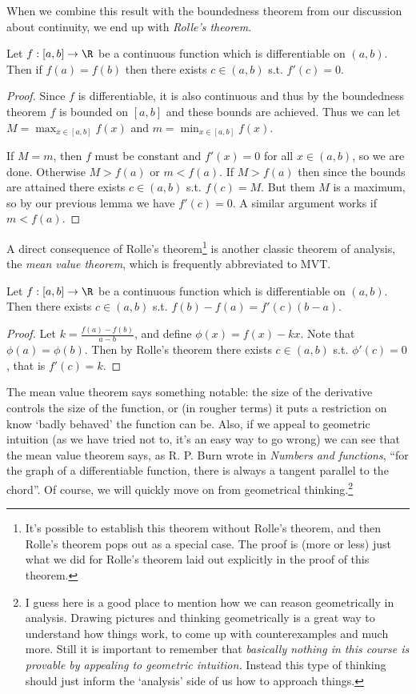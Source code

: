 When we combine this result with the boundedness theorem from our discussion about continuity, we end up with \emph{Rolle's theorem}.

\begin{theorem}
	Let $f: [a, b] \rightarrow \R$ be a continuous function which is differentiable on $(a, b)$. Then if $f(a) = f(b)$ then there exists $c \in (a, b)$ s.t. $f'(c) = 0$.
\end{theorem}
\begin{proof}
	Since $f$ is differentiable, it is also continuous and thus by the boundedness theorem $f$ is bounded on $[a, b]$ and these bounds are achieved.
	Thus we can let $M = \max_{x \in [a, b]} f(x)$ and $m = \min_{x \in [a, b]} f(x)$.

	If $M = m$, then $f$ must be constant and $f'(x) = 0$ for all $x \in (a, b)$, so we are done.
	Otherwise $M > f(a)$ or $m < f(a)$. If $M > f(a)$ then since the bounds are attained there exists $c \in (a, b)$ s.t. $f(c) = M$. But them $M$ is a maximum, so by our previous lemma we have $f'(c) = 0$. A similar argument works if $m < f(a)$.
\end{proof}

A direct consequence of Rolle's theorem\footnote{It's possible to establish this theorem without Rolle's theorem, and then Rolle's theorem pops out as a special case. The proof is (more or less) just what we did for Rolle's theorem laid out explicitly in the proof of this theorem.} 
is another classic theorem of analysis, the \emph{mean value theorem}, which is frequently abbreviated to MVT.

\begin{theorem}
	Let $f: [a, b] \rightarrow \R$ be a continuous function which is differentiable on $(a, b)$. Then there exists $c \in (a, b)$ s.t. $f(b) - f(a) = f'(c)(b - a)$.
\end{theorem}
\begin{proof}
	Let $k = \frac{f(a) - f(b)}{a - b}$, and define $\phi(x) = f(x) - kx$. Note that $\phi(a) = \phi(b)$. Then by Rolle's theorem there exists $c \in (a, b)$ s.t. $\phi'(c) = 0$, that is $f'(c) = k$.
\end{proof}

The mean value theorem says something notable: the size of the derivative controls the size of the function, or (in rougher terms) it puts a restriction on know `badly behaved' the function can be.
Also, if we appeal to geometric intuition (as we have tried not to, it's an easy way to go wrong) we can see that the mean value theorem says, as R. P. Burn wrote in \emph{Numbers and functions}, ``for the graph of a differentiable function, there is always a tangent parallel to the chord''. Of course, we will quickly move on from geometrical thinking.\footnote{I guess here is a good place to mention how we can reason geometrically in analysis. Drawing pictures and thinking geometrically is a great way to understand how things work, to come up with counterexamples and much more. Still it is important to remember that \emph{basically nothing in this course is provable by appealing to geometric intuition.} Instead this type of thinking should just inform the `analysis' side of us how to approach things.} 

